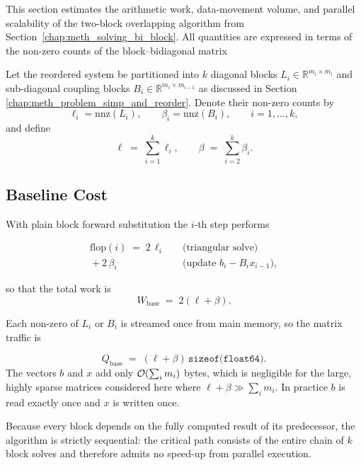 This section estimates the arithmetic work, data‐movement volume, and
parallel scalability of the two-block overlapping algorithm
from Section~\ref{chap:meth_solving_bi_block}.  All quantities are
expressed in terms of the non-zero counts of the block–bidiagonal
matrix

Let the reordered system be partitioned into
$k$ diagonal blocks $L_i\in\mathbb R^{m_i\times m_i}$ and
sub-diagonal coupling blocks $B_i\in\mathbb R^{m_i\times m_{i-1}}$
as discussed in Section \ref{chap:meth_problem_simp_and_reorder}.
Denote their non-zero counts by
$$
  \ell_i=\mathrm{nnz}(L_i), \qquad
  \beta_i=\mathrm{nnz}(B_i),\qquad i=1,\dots,k,
$$
and define
$$
  \ell \;=\; \sum_{i=1}^{k}\ell_i, 
  \qquad
  \beta \;=\; \sum_{i=2}^{k}\beta_i .
$$

\subsection{Baseline Cost}
\label{sec:baseline_cost}
With plain block forward substitution the $i$-th step performs

\begin{align}
  \mathrm{flop}(i) 
  \;=\;
  2\,\ell_i            &\quad\text{(triangular solve)}\\
  {}+2\,\beta_i        &\quad\text{(update }b_i-B_i x_{i-1}\text{)},
\end{align}

so that the total work is
\begin{equation}
  W_{\mathrm{base}}
  \;=\;
  2(\ell + \beta).
\end{equation}

Each non-zero of $L_i$ or $B_i$ is streamed once from main memory, so
the matrix traffic is

$$
  Q_{\mathrm{base}}
  \;=\;
  (\ell + \beta)\,\texttt{sizeof(float64)}.
$$
The vectors $b$ and $x$ add only ${\cal O}(\sum_i m_i)$ bytes, which is negligible for the large, highly sparse matrices considered here where $\ell+\beta\gg\sum_i m_i$. In practice $b$ is read exactly once and $x$ is written once.

Because every block depends on the fully computed result of its predecessor, the algorithm is strictly sequential: the critical path consists of the entire chain of $k$ block solves and therefore admits no speed-up from parallel execution.

